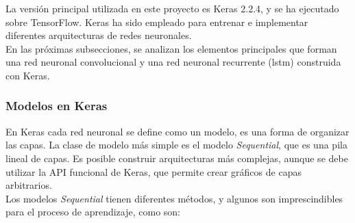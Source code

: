 La versión principal utilizada en este proyecto es Keras 2.2.4, y se ha ejecutado sobre TensorFlow. Keras ha sido empleado para entrenar e implementar diferentes arquitecturas de redes neuronales.\\

En las próximas subsecciones, se analizan los elementos principales que forman una red neuronal convolucional y una red neuronal recurrente (\acrshort{lstm}) construida con Keras.


\subsubsection{Modelos en Keras}

En Keras cada red neuronal se define como un modelo, es una forma de organizar las capas. La clase de modelo más simple es el modelo \textit{Sequential}, que es una pila lineal de capas. Es posible construir arquitecturas más complejas, aunque se debe utilizar la API funcional de Keras, que permite crear gráficos de capas arbitrarios.\\

Los modelos \textit{Sequential} tienen diferentes métodos, y algunos son imprescindibles para el proceso de aprendizaje, como son:

